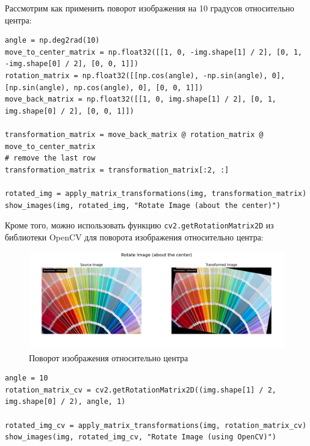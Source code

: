 Рассмотрим как применить поворот изображения на 10 градусов относительно центра:
\begin{lstlisting}[style=python_white, caption={Исходный код для поворота изображения с использованием библиотеки OpenCV}]
angle = np.deg2rad(10)
move_to_center_matrix = np.float32([[1, 0, -img.shape[1] / 2], [0, 1, -img.shape[0] / 2], [0, 0, 1]])
rotation_matrix = np.float32([[np.cos(angle), -np.sin(angle), 0], [np.sin(angle), np.cos(angle), 0], [0, 0, 1]])
move_back_matrix = np.float32([[1, 0, img.shape[1] / 2], [0, 1, img.shape[0] / 2], [0, 0, 1]])

transformation_matrix = move_back_matrix @ rotation_matrix @ move_to_center_matrix 
# remove the last row 
transformation_matrix = transformation_matrix[:2, :]

rotated_img = apply_matrix_transformations(img, transformation_matrix)
show_images(img, rotated_img, "Rotate Image (about the center)")
\end{lstlisting}

Кроме того, можно использовать функцию \texttt{cv2.getRotationMatrix2D} из библиотеки OpenCV для поворота изображения относительно центра:
\begin{figure}[ht]
    \includegraphics[width=\textwidth]{../results/Rotate Image (about the center).png}
    \caption{Поворот изображения относительно центра}
    \label{fig:rotate_image_center}
\end{figure}

\begin{lstlisting}[style=python_white, caption={Исходный код для поворота изображения относительно центра с использованием библиотеки OpenCV}]
angle = 10
rotation_matrix_cv = cv2.getRotationMatrix2D((img.shape[1] / 2, img.shape[0] / 2), angle, 1)

rotated_img_cv = apply_matrix_transformations(img, rotation_matrix_cv)
show_images(img, rotated_img_cv, "Rotate Image (using OpenCV)")
\end{lstlisting}

